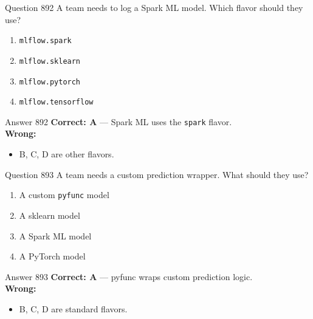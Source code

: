 \documentclass[aspectratio=169,11pt]{beamer}
\begin{document}
	\begin{frame}{Question 892}
		A team needs to log a Spark ML model. Which flavor should they use?
		\begin{enumerate}[label=\Alph*.]
			\item \texttt{mlflow.spark}
			\item \texttt{mlflow.sklearn}
			\item \texttt{mlflow.pytorch}
			\item \texttt{mlflow.tensorflow}
		\end{enumerate}
	\end{frame}
	\begin{frame}{Answer 892}
		\textbf{Correct: A} --- Spark ML uses the \texttt{spark} flavor.\\
		\vspace{0.5em}
		\textbf{Wrong:}
		\begin{itemize}
			\item B, C, D are other flavors.
		\end{itemize}
	\end{frame}
	
	\begin{frame}{Question 893}
		A team needs a custom prediction wrapper. What should they use?
		\begin{enumerate}[label=\Alph*.]
			\item A custom \texttt{pyfunc} model
			\item A sklearn model
			\item A Spark ML model
			\item A PyTorch model
		\end{enumerate}
	\end{frame}
	\begin{frame}{Answer 893}
		\textbf{Correct: A} --- pyfunc wraps custom prediction logic.\\
		\vspace{0.5em}
		\textbf{Wrong:}
		\begin{itemize}
			\item B, C, D are standard flavors.
		\end{itemize}
	\end{frame}
	
\end{document}
